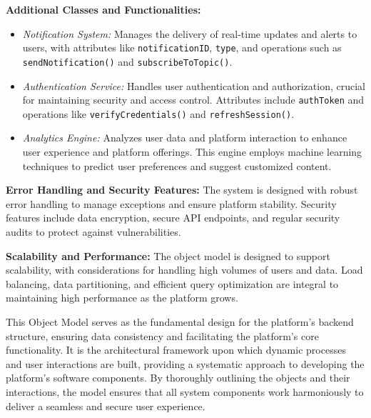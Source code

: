 \documentclass[12pt]{report}
\begin{document}
\textbf{Additional Classes and Functionalities:}
\begin{itemize}
    \item \textit{Notification System:} Manages the delivery of real-time updates and alerts to users, with attributes like \texttt{notificationID}, \texttt{type}, and operations such as \texttt{sendNotification()} and \texttt{subscribeToTopic()}.
    \item \textit{Authentication Service:} Handles user authentication and authorization, crucial for maintaining security and access control. Attributes include \texttt{authToken} and operations like \texttt{verifyCredentials()} and \texttt{refreshSession()}.
    \item \textit{Analytics Engine:} Analyzes user data and platform interaction to enhance user experience and platform offerings. This engine employs machine learning techniques to predict user preferences and suggest customized content.
\end{itemize}

\textbf{Error Handling and Security Features:}
The system is designed with robust error handling to manage exceptions and ensure platform stability. Security features include data encryption, secure API endpoints, and regular security audits to protect against vulnerabilities.

\textbf{Scalability and Performance:}
The object model is designed to support scalability, with considerations for handling high volumes of users and data. Load balancing, data partitioning, and efficient query optimization are integral to maintaining high performance as the platform grows.

This Object Model serves as the fundamental design for the platform's backend structure, ensuring data consistency and facilitating the platform's core functionality. It is the architectural framework upon which dynamic processes and user interactions are built, providing a systematic approach to developing the platform's software components. By thoroughly outlining the objects and their interactions, the model ensures that all system components work harmoniously to deliver a seamless and secure user experience.
\end{document}
